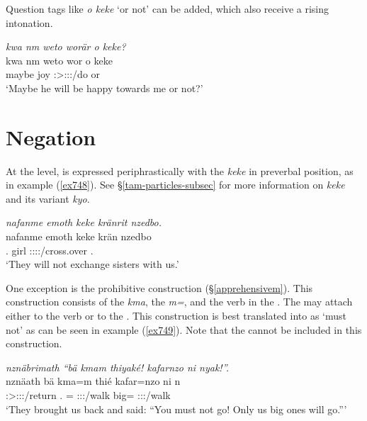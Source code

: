Question tags like \emph{o keke} `or not' can be added, which also receive a rising intonation.

\begin{exe}
	\ex \emph{kwa nm weto worär o keke?}\\
	\gll kwa nm weto wor o keke\\
	{\Fut} maybe joy \Stsg:\Sbj>\Fsg:\Obj:\Nonpast:\Ipfv/do or {\Neg}\\
	\trans `Maybe he will be happy towards me or not?'
	\label{ex705}
\end{exe}

\section{Negation}\label{negationclause}

At the  level,  is expressed periphrastically with the  \emph{keke} in preverbal position, as in example (\ref{ex748}). See \S\ref{tam-particles-subsec} for more information on \emph{keke} and its variant \emph{kyo}.

\begin{exe}
	\ex \emph{nafanme emoth keke kränrit nzedbo.}\\
	\gll nafanme emoth keke krän nzedbo\\
	\Tpl.{\Poss} girl {\Neg} \Stsg:\Sbj:\Irr:\Pfv:\Venit/cross.over \Fnsg.\All\\
	\trans `They will not exchange sisters with us.'
	\label{ex748}
\end{exe}

One exception is the prohibitive construction (\S\ref{apprehensivem}). This construction consists of the   \emph{kma}, the   \emph{m=}, and the verb in the . The   may attach either to the verb or to the  . This construction is best translated into  as `must not' as can be seen in example (\ref{ex749}). Note that the  cannot be included in this construction.

\begin{exe}
	\ex \emph{nznäbrimath ``bä kmam thiyaké! kafarnzo ni nyak!''.}\\
	\gll nznäath bä kma=m thié kafar=nzo ni n\\
	\Stpl:\Sbj>\Fpl:\Obj:\Pst:\Pfv/return \Second.{\Abs} \Pot={\Appr} \Spl:\Sbj:\Imp:\Ipfv/walk big={\Only} {\Fnsg} \Fpl:\Sbj:\Nonpast:\Ipfv/walk\\
	\trans `They brought us back and said: ``You must not go! Only us big ones will go.'''\\
	\label{ex749}
\end{exe}

